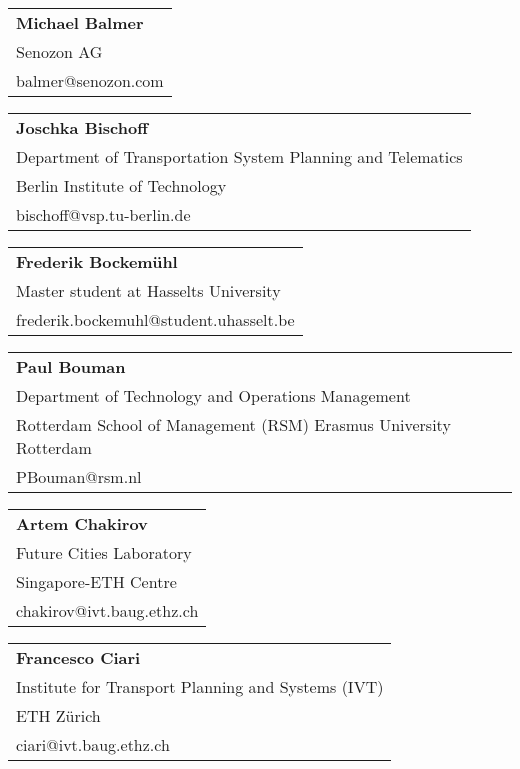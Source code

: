 \begin{tabular}[width=0.48\textwidth]{l}
\textbf{Michael Balmer} \\
Senozon AG \\
balmer@senozon.com \\
\end{tabular}

\begin{tabular}[width=0.48\textwidth]{l}
\textbf{Joschka Bischoff} \\
Department of Transportation System Planning and Telematics \\
Berlin Institute of Technology \\
bischoff@vsp.tu-berlin.de \\
\end{tabular}

\begin{tabular}[width=0.48\textwidth]{l}
\textbf{Frederik Bockemühl} \\
Master student at Hasselts University \\
frederik.bockemuhl@student.uhasselt.be \\
\end{tabular}

\begin{tabular}[width=0.48\textwidth]{l}
\textbf{Paul Bouman} \\
Department of Technology and Operations Management \\
Rotterdam School of Management (RSM) Erasmus University Rotterdam \\
PBouman@rsm.nl \\
\end{tabular}

\begin{tabular}[width=0.48\textwidth]{l}
\textbf{Artem Chakirov} \\
Future Cities Laboratory \\
Singapore-ETH Centre\\
chakirov@ivt.baug.ethz.ch \\
\end{tabular}

\begin{tabular}[width=0.48\textwidth]{l}
\textbf{Francesco Ciari} \\
Institute for Transport Planning and Systems (IVT) \\
ETH Zürich \\
ciari@ivt.baug.ethz.ch \\
\end{tabular}

